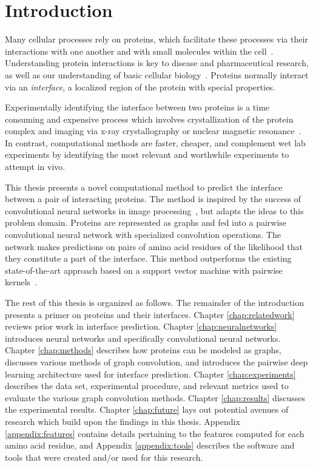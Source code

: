 

\chapter{Introduction}
\label{chap:intro}

Many cellular processes rely on proteins, which facilitate these processes via their interactions with one another and with small molecules within the cell~\cite{scheeffink2003}.
Understanding protein interactions is key to disease and pharmaceutical research, as well as our understanding of basic cellular biology~\cite{fauman2003, altman2003}.
Proteins normally interact via an \textit{interface}, a localized region of the protein with special properties.

Experimentally identifying the interface between two proteins is a time consuming and expensive process which involves crystallization of the protein complex and imaging via x-ray crystallography or nuclear magnetic resonance~\cite{bijelic2017, ilarisavino2017, wang2017}.
In contrast, computational methods are faster, cheaper, and complement wet lab experiments by identifying the most relevant and worthwhile experiments to attempt in vivo.

This thesis presents a novel computational method to predict the interface between a pair of interacting proteins.
The method is inspired by the success of convolutional neural networks in image processing~\cite{gu2015, lecun2010}, but adapts the ideas to this problem domain.
Proteins are represented as graphs and fed into a pairwise convolutional neural network with specialized convolution operations.
The network makes predictions on pairs of amino acid residues of the likelihood that they constitute a part of the interface. 
This method outperforms the existing state-of-the-art approach based on a support vector machine with pairwise kernels~\cite{minhas2014}.

The rest of this thesis is organized as follows.
The remainder of the introduction presents a primer on proteins and their interfaces. 
Chapter \ref{chap:relatedwork} reviews prior work in interface prediction.
Chapter \ref{chap:neuralnetworks} introduces neural networks and specifically convolutional neural networks.
Chapter \ref{chap:methods} describes how proteins can be modeled as graphs, discusses various methods of graph convolution, and introduces the pairwise deep learning architecture used for interface prediction.
Chapter \ref{chap:experiments} describes the data set, experimental procedure, and relevant metrics used to evaluate the various graph convolution methods. 
Chapter \ref{chap:results} discusses the experimental results.
Chapter \ref{chap:future} lays out potential avenues of research which build upon the findings in this thesis. 
Appendix \ref{appendix:features} contains details pertaining to the features computed for each amino acid residue, and Appendix \ref{appendix:tools} describes the software and tools that were created and/or used for this research.

